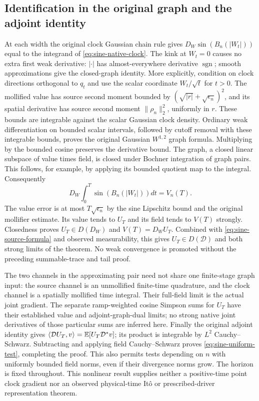 \documentclass[11pt]{article}
\newcommand{\D}{\mathcal D}\newcommand{\G}{\mathcal G}
\begin{document}
\subsection{Identification in the original graph and the adjoint identity}
At each width the original clock Gaussian chain rule gives
$D_W\sin(B_n(|W_t|))$
equal to the integrand of \eqref{eq:sine-native-clock}.
The kink at $W_t=0$ causes no extra first weak derivative:
$|\cdot|$ has almost-everywhere derivative $\operatorname{sgn}$;
smooth approximations give the closed-graph identity. More explicitly, condition on clock directions orthogonal to $q_t$ and use the scalar coordinate $W_t/\sqrt t$ for $t>0$. The mollified value has source second moment bounded by $(\sqrt{|r|}+\sqrt{\epsilon_n})^2$, and its spatial derivative has source second moment $\|\rho_n\|_2^2$, uniformly in $r$. These bounds are integrable against the scalar Gaussian clock density. Ordinary weak differentiation on bounded scalar intervals, followed by cutoff removal with these integrable bounds, proves the original Gaussian $W^{1,2}$ graph formula. Multiplying by the bounded cosine preserves the derivative bound.
The graph, a closed linear subspace of value times field, is closed
under Bochner integration of graph pairs. This follows, for example,
by applying its bounded quotient map to the integral.
Consequently
\[
 D_W\int_0^T\sin(B_n(|W_t|))dt=V_n(T).
\]
The value error is at most $T\sqrt{\epsilon_n}$ by the sine
Lipschitz bound and the original mollifier estimate. Its value tends
to $U_T$ and its field tends to $V(T)$ strongly. Closedness proves
$U_T\in D(D_W)$ and $V(T)=D_WU_T$. Combined with
\eqref{eq:sine-source-formula} and observed measurability, this gives
$U_T\in D(\D)$ and both strong limits of the theorem. No weak
convergence is promoted without the preceding summable-trace and
tail proof.

The two channels in the approximating pair need not share one
finite-stage graph input: the source channel is an unmollified
finite-time quadrature, and the clock channel is a spatially
mollified time integral. Their full-field limit is the actual joint
gradient. The separate ramp-weighted cosine Simpson sums for $U_T$
have their established value and adjoint-graph-dual limits; no
strong native joint derivatives of those particular sums are
inferred here. Finally the original adjoint identity gives
$\langle\D U_T,v\rangle=\E[U_T\D^*v]$; its product is integrable
by $L^2$ Cauchy--Schwarz. Subtracting and applying field
Cauchy--Schwarz proves \eqref{eq:sine-uniform-test}, completing
the proof. This also permits tests depending on $n$ with uniformly
bounded field norms, even if their divergence norms grow.
The horizon is fixed throughout. This nonlinear result supplies
neither a positive-time point clock gradient nor an observed
physical-time It\^o or prescribed-driver representation theorem.
\end{document}
